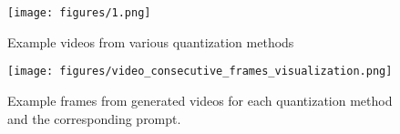 
\begin{figure}[t]
	\centering
	\texttt{[image: figures/1.png]}
	\caption{Example videos from various quantization methods
	}
	\label{fig1}
\end{figure}

\begin{figure*}[t]
	\centering
	\texttt{[image: figures/video\_consecutive\_frames\_visualization.png]}
	\caption{Example frames from generated videos for each quantization method and the corresponding prompt.
	}
	\label{fig_frames}
\end{figure*}